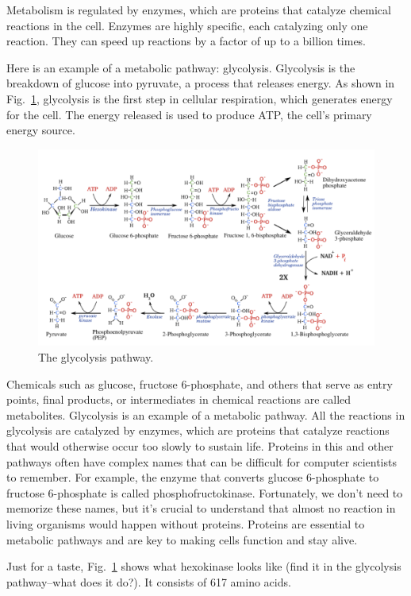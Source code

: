 Metabolism is regulated by enzymes, which are proteins that catalyze chemical reactions in the cell. Enzymes are highly specific, each catalyzing only one reaction. They can speed up reactions by a factor of up to a billion times.

Here is an example of a metabolic pathway: glycolysis. Glycolysis is the breakdown of glucose into pyruvate, a process that releases energy. As shown in Fig.~\ref{fig:glycolysis}, glycolysis is the first step in cellular respiration, which generates energy for the cell. The energy released is used to produce ATP, the cell's primary energy source.

\begin{figure}
    \includegraphics{figs/molbiol/glycolysis.png}
    \caption[6pt]{The glycolysis pathway.}
    \label{fig:glycolysis}
\end{figure}

Chemicals such as glucose, fructose 6-phosphate, and others that serve as entry points, final products, or intermediates in chemical reactions are called metabolites. Glycolysis is an example of a metabolic pathway. All the reactions in glycolysis are catalyzed by enzymes, which are proteins that catalyze reactions that would otherwise occur too slowly to sustain life. Proteins in this and other pathways often have complex names that can be difficult for computer scientists to remember. For example, the enzyme that converts glucose 6-phosphate to fructose 6-phosphate is called phosphofructokinase. Fortunately, we don't need to memorize these names, but it's crucial to understand that almost no reaction in living organisms would happen without proteins. Proteins are essential to metabolic pathways and are key to making cells function and stay alive.

Just for a taste, Fig.~\ref{fig:glycolysis} shows what hexokinase looks like (find it in the glycolysis pathway--what does it do?). It consists of 617 amino acids.

